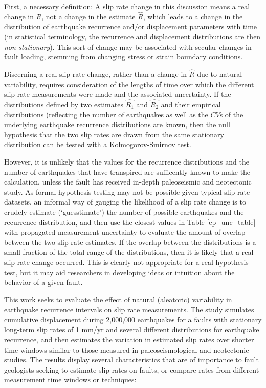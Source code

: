 \documentclass[se, manuscript]{copernicus}
\begin{document}
First, a necessary definition: A slip rate change in this discussion
means a real change in \(R\), not a change in the estimate \(\hat{R}\),
which leads to a change in the distribution of earthquake recurrence
and/or displacement parameters with time (in statistical terminology,
the recurrence and displacement distributions are then
\emph{non-stationary}). This sort of change may be associated with
secular changes in fault loading, stemming from changing stress or
strain boundary conditions.

Discerning a real slip rate change, rather than a change in \(\hat{R}\)
due to natural variability, requires consideration of the lengths of
time over which the different slip rate measurements were made and the
associated uncertainty. If the distributions defined by two estimates
\(\hat{R_1}\) and \(\hat{R_2}\) and their empirical distributions
(reflecting the number of earthquakes as well as the \(CV\)s of the
underlying earthquake recurrence distributions are known, then the null
hypothesis that the two slip rates are drawn from the same stationary
distribution can be tested with a Kolmogorov-Smirnov test.

However, it is unlikely that the values for the recurrence distributions
and the number of earthquakes that have transpired are sufficently known
to make the calculation, unless the fault has received in-depth
paleoseismic and neotectonic study. As formal hypothesis testing may not
be possible given typical slip rate datasets, an informal way of gauging
the likelihood of a slip rate change is to crudely estimate
(`guesstimate') the number of possible earthquakes and the recurrence
distribution, and then use the closest values in Table
\ref{ep_unc_table} with propagated measurement uncertainty to evaluate
the amount of overlap between the two slip rate estimates. If the
overlap between the distributions is a small fraction of the total range
of the distributions, then it is likely that a real slip rate change
occurred. This is clearly not appropriate for a real hypothesis test,
but it may aid researchers in developing ideas or intuition about the
behavior of a given fault.

\conclusions

This work seeks to evaluate the effect of natural (aleatoric) variability in 
earthquake recurrence intervals on slip rate
measurements. The study simulates cumulative displacement during
2,000,000 earthquakes for a faults with stationary long-term slip rates
of 1 mm/yr and several different distributions for earthquake
recurrence, and then estimates the variation in estimated slip rates
over shorter time windows similar to those measured in
paleoseismological and neotectonic studies. The results display several
characteristics that are of importance to fault geologists seeking to
estimate slip rates on faults, or compare rates from different
measurement time windows or techniques:
\end{document}
